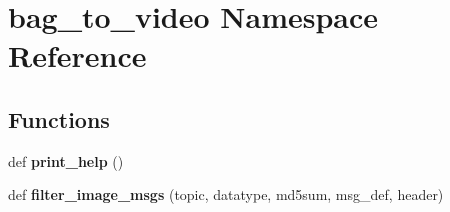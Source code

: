 \hypertarget{namespacebag__to__video}{}\section{bag\+\_\+to\+\_\+video Namespace Reference}
\label{namespacebag__to__video}
\subsection*{Functions}
\begin{DoxyCompactItemize}
\item 
\mbox{\label{namespacebag__to__video_aaf2f98950e921f6af2c2bc92ea3465a5}} 
def {\bfseries print\+\_\+help} ()
\item 
\mbox{\label{namespacebag__to__video_ac09610df8376d449905ebc07d3062cf6}} 
def {\bfseries filter\+\_\+image\+\_\+msgs} (topic, datatype, md5sum, msg\+\_\+def, header)
\end{DoxyCompactItemize}
